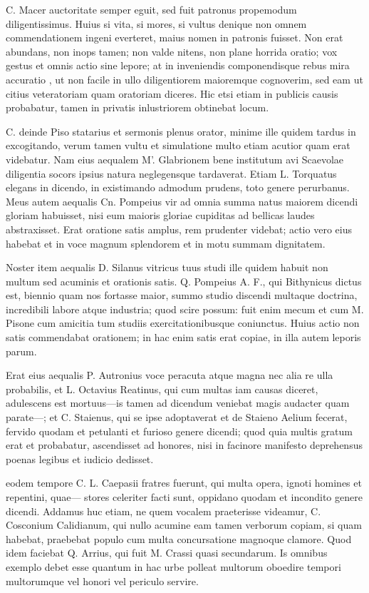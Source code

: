  C. Macer auctoritate semper eguit, sed fuit patronus propemodum diligentissimus. Huius si vita, si mores, si vultus denique non omnem commendationem ingeni everteret, maius nomen in patronis fuisset. Non erat abundans, non inops tamen; non valde nitens, non plane horrida oratio; vox gestus et omnis actio sine lepore; at in inveniendis componendisque rebus mira accuratio , ut non facile in ullo diligentiorem maioremque cognoverim, sed eam ut citius veteratoriam quam oratoriam diceres. Hic etsi etiam in publicis causis probabatur, tamen in privatis inlustriorem obtinebat locum.

 C. deinde Piso statarius et sermonis plenus orator, minime ille quidem tardus in excogitando, verum tamen vultu et simulatione multo etiam acutior quam erat videbatur. Nam eius aequalem M'. Glabrionem bene institutum avi Scaevolae diligentia socors ipsius natura neglegensque tardaverat. Etiam L. Torquatus elegans in dicendo, in existimando admodum prudens, toto genere perurbanus. Meus autem aequalis Cn. Pompeius vir ad omnia summa natus maiorem dicendi gloriam habuisset, nisi eum maioris gloriae cupiditas ad bellicas laudes abstraxisset. Erat oratione satis amplus, rem prudenter videbat; actio vero eius habebat et in voce magnum splendorem et in motu summam dignitatem.

 Noster item aequalis D. Silanus vitricus tuus studi ille quidem habuit non multum sed acuminis et orationis satis. Q. Pompeius A. F., qui Bithynicus dictus est, biennio quam nos fortasse maior, summo studio discendi multaque doctrina, incredibili labore atque industria; quod scire possum: fuit enim mecum et cum M. Pisone cum amicitia tum studiis exercitationibusque coniunctus. Huius actio non satis commendabat orationem; in hac enim satis erat copiae, in illa autem leporis parum.

 Erat eius aequalis P. Autronius voce peracuta atque magna nec alia re ulla probabilis, et L. Octavius Reatinus, qui cum multas iam causas diceret, adulescens est mortuus—is tamen ad dicendum veniebat magis audacter quam parate—; et C. Staienus, qui se ipse adoptaverat et de Staieno Aelium fecerat, fervido quodam et petulanti et furioso genere dicendi; quod quia multis gratum erat et probabatur, ascendisset ad honores, nisi in facinore manifesto deprehensus poenas legibus et iudicio dedisset.

 eodem tempore C. L. Caepasii fratres fuerunt, qui multa opera, ignoti homines et repentini, quae— stores celeriter facti sunt, oppidano quodam et incondito genere dicendi. Addamus huc etiam, ne quem vocalem praeterisse videamur, C. Cosconium Calidianum, qui nullo acumine eam tamen verborum copiam, si quam habebat, praebebat populo cum multa concursatione magnoque clamore. Quod idem faciebat Q. Arrius, qui fuit M. Crassi quasi secundarum. Is omnibus exemplo debet esse quantum in hac urbe polleat multorum oboedire tempori multorumque vel honori vel periculo servire.


